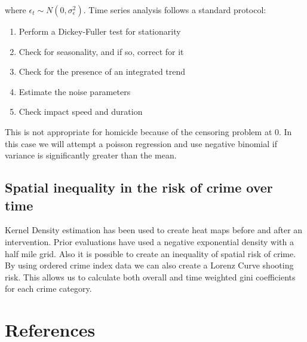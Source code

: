 \documentclass[11pt]{article}
\begin{document}
where \( \epsilon_t \sim N(0, \sigma^2_{\epsilon}) \).  Time series analysis follows a standard protocol:

\begin{enumerate}
\item Perform a Dickey-Fuller test for stationarity
\item Check for seasonality, and if so, correct for it
\item Check for the presence of an integrated trend
\item Estimate the noise parameters
\item Check impact speed and duration
\end{enumerate}

This is not appropriate for homicide because of the censoring problem at 0.  In this case we will attempt a
poisson regression and use negative binomial if variance is significantly greater than the mean.
\subsection{Spatial inequality in the risk of crime over time}
\label{sec-3-2}

Kernel Density estimation has been used to create heat maps before and after an intervention.  Prior 
evaluations have used a negative exponential density with a half mile grid.  Also it is possible to
create an inequality of spatial risk of crime.  By using ordered crime index data we can also create a
Lorenz Curve shooting risk.  This allows us to calculate both overall and time weighted gini coefficients 
for each crime category.
\section{References}
\label{sec-4}

\printbibliography[heading=none]
\end{document}
